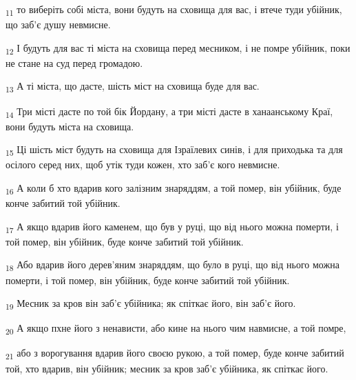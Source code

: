 \begin{tcolorbox}
\textsubscript{11} то виберіть собі міста, вони будуть на сховища для вас, і втече туди убійник, що заб'є душу невмисне.
\end{tcolorbox}
\begin{tcolorbox}
\textsubscript{12} І будуть для вас ті міста на сховища перед месником, і не помре убійник, поки не стане на суд перед громадою.
\end{tcolorbox}
\begin{tcolorbox}
\textsubscript{13} А ті міста, що дасте, шість міст на сховища буде для вас.
\end{tcolorbox}
\begin{tcolorbox}
\textsubscript{14} Три місті дасте по той бік Йордану, а три місті дасте в ханаанському Краї, вони будуть міста на сховища.
\end{tcolorbox}
\begin{tcolorbox}
\textsubscript{15} Ці шість міст будуть на сховища для Ізраїлевих синів, і для приходька та для осілого серед них, щоб утік туди кожен, хто заб'є кого невмисне.
\end{tcolorbox}
\begin{tcolorbox}
\textsubscript{16} А коли б хто вдарив кого залізним знаряддям, а той помер, він убійник, буде конче забитий той убійник.
\end{tcolorbox}
\begin{tcolorbox}
\textsubscript{17} А якщо вдарив його каменем, що був у руці, що від нього можна померти, і той помер, він убійник, буде конче забитий той убійник.
\end{tcolorbox}
\begin{tcolorbox}
\textsubscript{18} Або вдарив його дерев'яним знаряддям, що було в руці, що від нього можна померти, і той помер, він убійник, буде конче забитий той убійник.
\end{tcolorbox}
\begin{tcolorbox}
\textsubscript{19} Месник за кров він заб'є убійника; як спіткає його, він заб'є його.
\end{tcolorbox}
\begin{tcolorbox}
\textsubscript{20} А якщо пхне його з ненависти, або кине на нього чим навмисне, а той помре,
\end{tcolorbox}
\begin{tcolorbox}
\textsubscript{21} або з ворогування вдарив його своєю рукою, а той помер, буде конче забитий той, хто вдарив, він убійник; месник за кров заб'є убійника, як спіткає його.
\end{tcolorbox}
